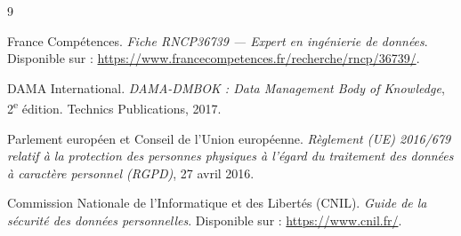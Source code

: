 \documentclass[11pt]{article}
\begin{document}
\begin{thebibliography}{9}

France Compétences.
\textit{Fiche RNCP36739 --- Expert en ingénierie de données}.
Disponible sur : \url{https://www.francecompetences.fr/recherche/rncp/36739/}.

DAMA International.
\textit{DAMA-DMBOK : Data Management Body of Knowledge}, 2\textsuperscript{e} édition.
Technics Publications, 2017.

Parlement européen et Conseil de l'Union européenne.
\textit{Règlement (UE) 2016/679 relatif à la protection des personnes physiques à
l'égard du traitement des données à caractère personnel (RGPD)}, 27 avril 2016.

Commission Nationale de l'Informatique et des Libertés (CNIL).
\textit{Guide de la sécurité des données personnelles}.
Disponible sur : \url{https://www.cnil.fr/}.

\end{thebibliography}
\end{document}

